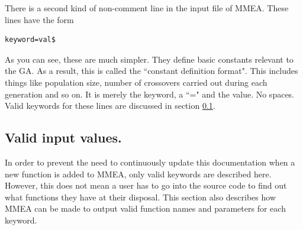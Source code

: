 \documentclass[12pt]{article}
\begin{document}
There is a second kind of non-comment line in the input file of MMEA. These lines have the form
\begin{verbatim}
keyword=val$
\end{verbatim}
As you can see, these are much simpler. They define basic constants relevant to the GA. As a result, this is called the ``constant definition format". This includes things like population size, number of crossovers carried out during each generation and so on. It is merely the keyword, a ``=" and the value. No spaces. Valid keywords for these lines are discussed in section \ref{input_files_valid_parameters}.

\subsection{Valid input values.}
\label{input_files_valid_parameters}
In order to prevent the need to continuously update this documentation when a new function is added to MMEA, only valid keywords are described here. However, this does not mean a user has to go into the source code to find out what functions they have at their disposal. This section also describes how MMEA can be made to output valid function names and parameters for each keyword.
\end{document}
